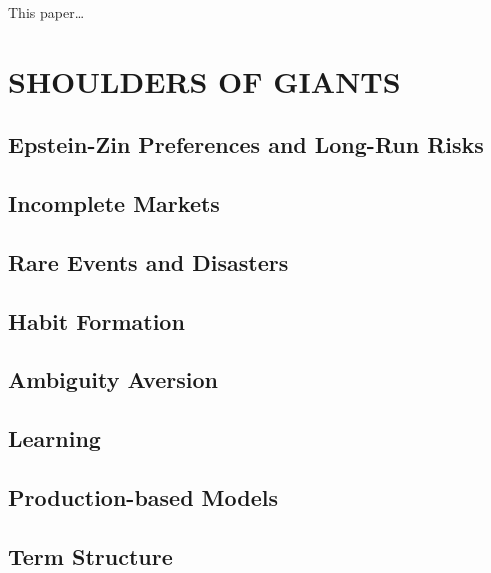 \documentclass[
]{book}
\begin{document}
This paper\ldots{}

\hypertarget{part-shoulders-of-giants}{%
\part*{SHOULDERS OF GIANTS}\label{part-shoulders-of-giants}}

\hypertarget{epstein-zin-preferences-and-long-run-risks}{%
\chapter{Epstein-Zin Preferences and Long-Run Risks}\label{epstein-zin-preferences-and-long-run-risks}}

\hypertarget{incomplete-markets}{%
\chapter{Incomplete Markets}\label{incomplete-markets}}

\hypertarget{rare-events-and-disasters}{%
\chapter{Rare Events and Disasters}\label{rare-events-and-disasters}}

\hypertarget{habit-formation}{%
\chapter{Habit Formation}\label{habit-formation}}

\hypertarget{ambiguity-aversion}{%
\chapter{Ambiguity Aversion}\label{ambiguity-aversion}}

\hypertarget{learning}{%
\chapter{Learning}\label{learning}}

\hypertarget{production-based-models}{%
\chapter{Production-based Models}\label{production-based-models}}

\hypertarget{term-structure}{%
\chapter{Term Structure}\label{term-structure}}
\end{document}
